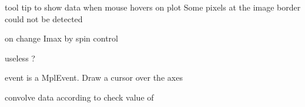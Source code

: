\documentclass[letterpaper,10pt,english]{sphinxmanual}
\begin{document}
\begin{fulllineitems}
\begin{fulllineitems}
\end{fulllineitems}


\begin{fulllineitems}
\label{\detokenize{PeakSearchGUI:LaueTools.GUI.PeakSearchGUI.MainPeakSearchFrame.onMotion_ToolTip}}
tool tip to show data when mouse hovers on plot
Some pixels at the image border could not be detected

\end{fulllineitems}


\begin{fulllineitems}
\label{\detokenize{PeakSearchGUI:LaueTools.GUI.PeakSearchGUI.MainPeakSearchFrame.OnSpinCtrl_ImaxDisplayed}}
on change Imax by spin control

\end{fulllineitems}


\begin{fulllineitems}
\label{\detokenize{PeakSearchGUI:LaueTools.GUI.PeakSearchGUI.MainPeakSearchFrame.Get_XYI_from_fit2dpeaksfile}}
useless ?

\end{fulllineitems}


\begin{fulllineitems}
\label{\detokenize{PeakSearchGUI:LaueTools.GUI.PeakSearchGUI.MainPeakSearchFrame.draw_cursor}}
event is a MplEvent.  Draw a cursor over the axes

\end{fulllineitems}


\begin{fulllineitems}
\label{\detokenize{PeakSearchGUI:LaueTools.GUI.PeakSearchGUI.MainPeakSearchFrame.getConvolvedData}}
convolve data according to check value of


\end{fulllineitems}
\end{fulllineitems}
\end{document}
